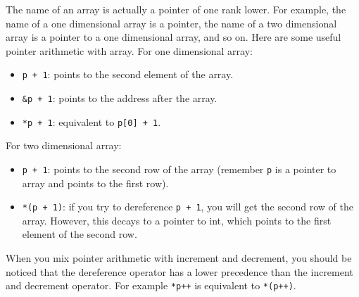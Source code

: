 \documentclass[a4paper,12pt]{article}
\begin{document}
The name of an array is actually a pointer of one rank lower.
For example, the name of a one dimensional array is a pointer, the name of a two dimensional array is a pointer to a one dimensional array, and so on.
Here are some useful pointer arithmetic with array.
For one dimensional array:
\begin{itemize}
	\item \texttt{p + 1}: points to the second element of the array.
	\item \texttt{\&p + 1}: points to the address after the array.
	\item \texttt{*p + 1}: equivalent to \texttt{p[0] + 1}.
\end{itemize}

For two dimensional array:
\begin{itemize}
	\item \texttt{p + 1}: points to the second row of the array (remember \texttt{p} is a pointer to array and points to the first row).
	\item \texttt{*(p + 1)}: if you try to dereference \texttt{p + 1}, you will get the second row of the array.
		However, this decays to a pointer to int, which points to the first element of the second row.
\end{itemize}

When you mix pointer arithmetic with increment and decrement, you should be noticed that the dereference operator has a lower precedence than the increment and decrement operator.
For example \texttt{*p++} is equivalent to \texttt{*(p++)}.
\end{document}
